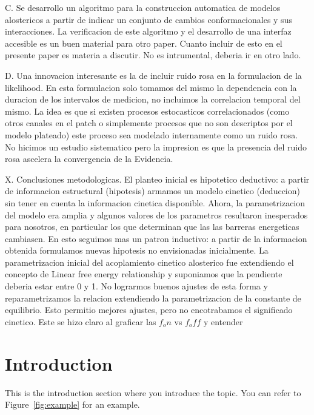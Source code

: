 \documentclass[a4paper,12pt]{article}
\begin{document}
		
		C. Se desarrollo un algoritmo para la construccion automatica de modelos alostericos a partir de indicar un conjunto de cambios conformacionales y sus interacciones. La verificacion de este algoritmo y el desarrollo de una interfaz accesible es un buen material para otro paper. Cuanto incluir de esto en el presente paper es materia a discutir. No es intrumental, deberia ir en otro lado. 
		
		D. Una innovacion interesante es la de incluir ruido rosa en la formulacion de la likelihood. En esta formulacion solo tomamos del mismo la dependencia con la duracion de los intervalos de medicion, no incluimos la correlacion temporal del mismo. La idea es que si existen procesos estocasticos correlacionados (como otros canales en el patch o simplemente procesos que no son descriptos por el modelo plateado) este proceso sea modelado internamente como un ruido rosa. No hicimos un estudio sistematico pero la impresion es que la presencia del ruido rosa ascelera la convergencia de la Evidencia. 
		
		
		
		
		
		X. Conclusiones metodologicas. El planteo inicial es hipotetico deductivo: a partir de informacion estructural (hipotesis) armamos un modelo cinetico (deduccion)  sin tener en cuenta la informacion cinetica disponible. 
		Ahora, la parametrizacion del modelo era amplia y algunos valores de los parametros resultaron inesperados para nosotros, en particular los que determinan que las las barreras energeticas cambiasen. En esto seguimos mas un patron inductivo: a partir de la informacion obtenida formulamos nuevas hipotesis no envisionadas inicialmente. 
		La parametrizacion inicial del acoplamiento cinetico alosterico fue extendiendo el concepto de Linear free energy relationship y suponiamos que la pendiente deberia estar entre 0 y 1. No lograrmos buenos ajustes de esta forma y reparametrizamos la relacion extendiendo la parametrizacion de la constante de equilibrio. Esto permitio mejores ajustes, pero no encotrabamos el significado cinetico. Este se hizo claro al graficar las $f_on$ vs $f_off$ y entender   
	
	
	
	\section{Introduction}
	This is the introduction section where you introduce the topic. 
	You can refer to Figure~\ref{fig:example} for an example.
	
\end{document}
